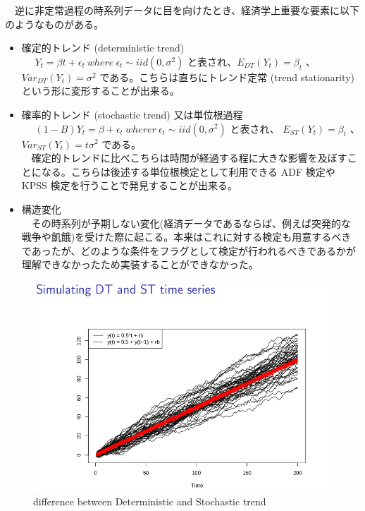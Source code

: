 \documentclass{scrartcl}
\begin{document}
　逆に非定常過程の時系列データに目を向けたとき、経済学上重要な要素に以下のようなものがある。\\
\begin{itemize}
\item 確定的トレンド (deterministic trend)\\
　 \(Y_t = \beta t + \epsilon_t \ where \ \epsilon_t \sim iid(0, \sigma^2)\) と表され、\(E_{DT}(Y_t) = \beta_t\) 、 \(Var_{DT}(Y_t) = \sigma^2\) である。こちらは直ちにトレンド定常 (trend stationarity) という形に変形することが出来る。\\
\item 確率的トレンド (stochastic trend) 又は単位根過程\\
　 \((1-B)Y_t = \beta + \epsilon_t \ wherer \ \epsilon_t \sim iid(0,\sigma^2)\) と表され、 \(E_{ST}(Y_t) = \beta_t\) 、 \(Var_{ST}(Y_t) = t \sigma^2\) である。\\
　確定的トレンドに比べこちらは時間が経過する程に大きな影響を及ぼすことになる。こちらは後述する単位根検定として利用できる ADF 検定や KPSS 検定を行うことで発見することが出来る。\\
\item 構造変化\\
　その時系列が予期しない変化(経済データであるならば、例えば突発的な戦争や飢餓)を受けた際に起こる。本来はこれに対する検定も用意するべきであったが、どのような条件をフラグとして検定が行われるべきであるかが理解できなかったため実装することができなかった。\\
\end{itemize}

\begin{figure}[htbp]
\centering
\includegraphics[width=16cm]{./hedibert.png}
\caption{difference between Deterministic and Stochastic trend \cite{hedibert}}
\end{figure}
\end{document}
